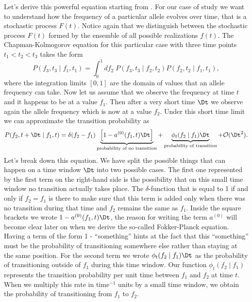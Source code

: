 Let's derive this powerful equation starting from .
For our case of study we want to understand how the frequency of a particular
allele evolves over time, that is a stochastic process $F(t)$. Notice again
that we distinguish between the stochastic process $F(t)$ formed by the
ensemble of all possible realizations $f(t)$. The Chapman-Kolmogorov equation
for this particular case with three time points $t_1 < t_2 < t_3$ takes the
form
\begin{equation}
  P(f_3, t_3 \mid f_1, t_1) = \int_0^1 df_2\; P(f_3, t_3 \mid f_2, t_2)
                                          P(f_2, t_2 \mid f_1, t_1),
  \label{eq_chapman_freq}
\end{equation}
where the integration limits $[0, 1]$ are the domain of values that an allele
frequency can take. Now let us assume that we observe the frequency at time $t$
and it happens to be at a value $f_1$. Then after a very short time $\Dt$ we
observe again the allele frequency which is now at a value $f_2$. Under this
short time limit we can approximate the transition probability as
\begin{equation}
  P(f_2, t + \Dt \mid f_1, t) = \delta(f_2 - f_1)
  \underbrace{\left[ 1 - a^{(0)}(f_1, t) \Dt \right]}_{\text{probability
  of no transition}} +
  \underbrace{\phi_t(f_2 \mid f_1)\Dt}_\text{probability of transition} +
  \mathcal{O}(\Dt^2).
  \label{eq_transition_short_time}
\end{equation}
Let's break down this equation. We have split the possible things that can
happen on a time window $\Dt$ into two possible cases. The first one
represented by the first term on the right-hand side is the possibility that on
this small time window no transition actually takes place. The
$\delta$-function that is equal to 1 if and only if $f_2 = f_1$ is there to
make sure that this term is added only when there was no transition during that
time and $f_2$ remains the same as $f_1$. Inside the square brackets we wrote
$1 - a^{(0)}(f_1, t) \Dt$, the reason for writing the term $a^{(0)}$ will
become clear later on when we derive the so-called Fokker-Planck equation.
Having a term of the form 1 - ``something'' hints at the fact that this
``something'' must be the probability of transitioning somewhere else rather
than staying at the same position. For the second term we wrote $\phi_t(f_2
\mid f_1)\Dt$ as the probability of transitioning outside of $f_1$ during this
time window. Our function $\phi_t(f_2 \mid f_1)$ represents the transition
probability per unit time between $f_1$ and $f_2$ at time $t$. When we multiply
this rate in time$^{-1}$ units by a small time window, we obtain the
probability of transitioning from $f_1$ to $f_2$.

